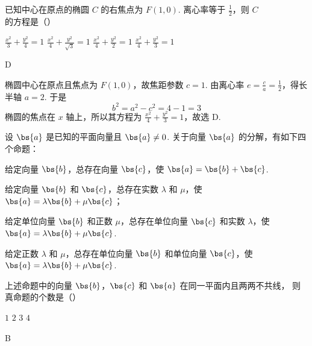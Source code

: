 \begin{problem}
已知中心在原点的椭圆 \(C\) 的右焦点为 \(F(1,0)\). 离心率等于 \(\frac{1}{2}\)，则 \(C\) 的方程是（\quad）

\choices
    {\(\frac{x^2}{3} +\frac{y^2}{4} = 1\)}
    {\(\frac{x^2}{4} +\frac{y^2}{\sqrt{3}} = 1\)}
    {\(\frac{x^2}{4} +\frac{y^2}{2} = 1\)}
    {\(\frac{x^2}{4} +\frac{y^2}{3} = 1\)}
\end{problem}

\begin{answer}
D
\end{answer}

\begin{solution}
椭圆中心在原点且焦点为 \(F(1,0)\)，故焦距参数 \(c=1\). 由离心率 \(e=\frac ca=\frac12\)，得长半轴 \(a=2\). 于是
\[
b^2=a^2-c^2=4-1=3
\]
椭圆的焦点在 \(x\) 轴上，所以其方程为 \(\frac{x^2}{4}+\frac{y^2}{3}=1\)，故选 D.
\end{solution}

\begin{problem}
设 \(\bs{a}\) 是已知的平面向量且 \(\bs{a} \neq 0\). 关于向量 \(\bs{a}\) 的分解，有如下四个命题：
\begin{circlelist}
\item 给定向量 \(\bs{b}\)，总存在向量 \(\bs{c}\)，使 \(\bs{a} = \bs{b} + \bs{c}\).
\item 给定向量 \(\bs{b}\) 和 \(\bs{c}\)，总存在实数 \(\lambda\) 和 \(\mu\)，使 \(\bs{a} = \lambda \bs{b} + \mu \bs{c}\)；
\item 给定单位向量 \(\bs{b}\) 和正数 \(\mu\)，总存在单位向量 \(\bs{c}\) 和实数 \(\lambda\)，使 \(\bs{a} = \lambda \bs{b} + \mu \bs{c}\).
\item 给定正数 \(\lambda\) 和 \(\mu\)，总存在单位向量 \(\bs{b}\) 和单位向量 \(\bs{c}\)，使 \(\bs{a} = \lambda \bs{b} + \mu \bs{c}\).
\end{circlelist}

上述命题中的向量 \(\bs{b}\)，\(\bs{c}\) 和 \(\bs{a}\) 在同一平面内且两两不共线，
则真命题的个数是（\quad）

\choices
    {\(1\)}
    {\(2\)}
    {\(3\)}
    {\(4\)}
\end{problem}

\begin{answer}
B
\end{answer}

